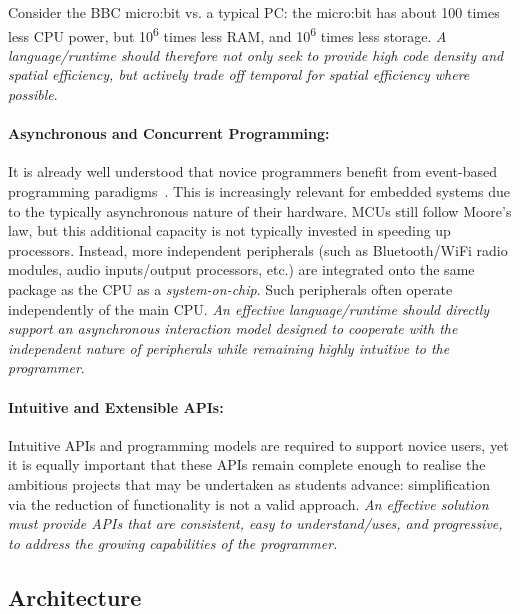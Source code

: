 Consider the BBC micro:bit vs. a typical PC: the micro:bit has about 100 times less CPU power, but 10\textsuperscript{6} times less RAM, and 10\textsuperscript{6} times less storage. \emph{A language/runtime should therefore not only seek to provide high code density and spatial efficiency, but actively trade off temporal for spatial efficiency where possible}.

\paragraph{Asynchronous and Concurrent Programming:}
It is already well understood that novice programmers benefit from event-based programming paradigms~\cite{maloney2008programming,maloney2010scratch,turbak2014events}. This is increasingly relevant for embedded systems due to the typically asynchronous nature of their hardware. MCUs still follow Moore's law, 
but this additional capacity is not typically invested in speeding
up processors. Instead, more independent peripherals (such as Bluetooth/WiFi radio modules, audio inputs/output processors, etc.) are integrated onto the same package as the CPU as a \emph{system-on-chip}. Such peripherals often operate independently of the main CPU. \emph{An effective language/runtime should directly support an asynchronous interaction model designed to cooperate with the independent nature of peripherals while remaining highly intuitive to the programmer}.

\paragraph{Intuitive and Extensible APIs:}
Intuitive APIs and programming models are required to support novice users, yet it is equally important that these APIs remain complete enough to realise the ambitious projects that may be undertaken as students advance: simplification via the reduction of functionality is not a valid approach. 
\emph{An effective solution must provide APIs that are consistent, easy to understand/uses, and progressive, to address the growing capabilities of the programmer.}

\subsection{Architecture}

